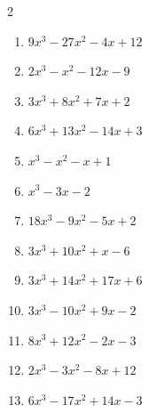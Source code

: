 \begin{multicols}{2}
\begin{enumerate}
  \item $9x^{3}-27x^{2}-4x+12$

        \phantom{$=(3x+2)(3x-2)(x-3)$}

  \item $2x^{3}-x^{2}-12x-9$

        \phantom{$=(2x+3)(x+1)(x-3)$}

  \item $3x^{3}+8x^{2}+7x+2$


  \item $6x^{3}+13x^{2}-14x+3$

        \phantom{$=(2x-1)(3x-1)(x+3)$}

\columnbreak %

  \item $x^{3}-x^{2}-x+1$


  \item $x^{3}-3x-2$


  \item $18x^{3}-9x^{2}-5x+2$

        \phantom{$=(2x+1)(3x-1)(3x-2)$}

  \item $3x^{3}+10x^{2}+x-6$

        \phantom{$=(3x-2)(x+1)(x+3)$}

  \item $3x^{3}+14x^{2}+17x+6$

        \phantom{$=(3x+2)(x+1)(x+3)$}

\columnbreak %

\resetques

  \item $3x^{3}-10x^{2}+9x-2$

        \phantom{$=(3x-1)(x-1)(x-2)$}

  \item $8x^{3}+12x^{2}-2x-3$

        \phantom{$=(2x+1)(2x+3)(2x-1)$}

  \item $2x^{3}-3x^{2}-8x+12$

        \phantom{$=(2x-3)(x+2)(x-2)$}

  \item $6x^{3}-17x^{2}+14x-3$

        \phantom{$=(2x-3)(3x-1)(x-1)$}


\end{enumerate}
\end{multicols}

